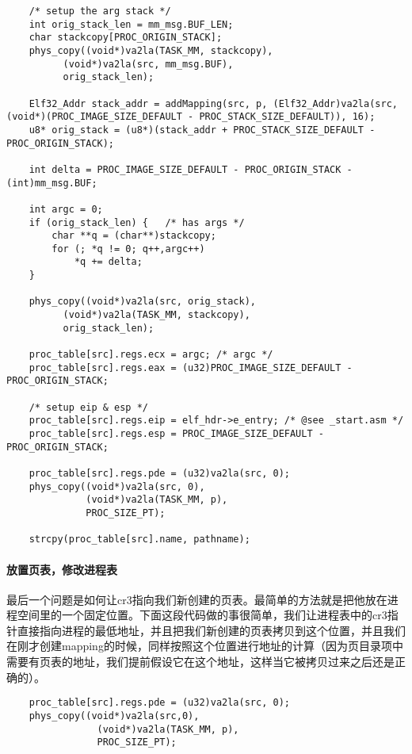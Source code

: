 \documentclass{whureport}
\begin{document}
\begin{lstlisting}
	/* setup the arg stack */
	int orig_stack_len = mm_msg.BUF_LEN;
	char stackcopy[PROC_ORIGIN_STACK];
	phys_copy((void*)va2la(TASK_MM, stackcopy),
		  (void*)va2la(src, mm_msg.BUF),
		  orig_stack_len);

    Elf32_Addr stack_addr = addMapping(src, p, (Elf32_Addr)va2la(src, (void*)(PROC_IMAGE_SIZE_DEFAULT - PROC_STACK_SIZE_DEFAULT)), 16);
    u8* orig_stack = (u8*)(stack_addr + PROC_STACK_SIZE_DEFAULT - PROC_ORIGIN_STACK);

    int delta = PROC_IMAGE_SIZE_DEFAULT - PROC_ORIGIN_STACK - (int)mm_msg.BUF;

    int argc = 0;
	if (orig_stack_len) {	/* has args */
		char **q = (char**)stackcopy;
		for (; *q != 0; q++,argc++)
			*q += delta;
	}

	phys_copy((void*)va2la(src, orig_stack),
		  (void*)va2la(TASK_MM, stackcopy),
		  orig_stack_len);

	proc_table[src].regs.ecx = argc; /* argc */
    proc_table[src].regs.eax = (u32)PROC_IMAGE_SIZE_DEFAULT - PROC_ORIGIN_STACK;

    /* setup eip & esp */
	proc_table[src].regs.eip = elf_hdr->e_entry; /* @see _start.asm */
    proc_table[src].regs.esp = PROC_IMAGE_SIZE_DEFAULT - PROC_ORIGIN_STACK;

    proc_table[src].regs.pde = (u32)va2la(src, 0);
    phys_copy((void*)va2la(src, 0),
              (void*)va2la(TASK_MM, p),
              PROC_SIZE_PT);

    strcpy(proc_table[src].name, pathname);
\end{lstlisting}


\paragraph{放置页表，修改进程表} 最后一个问题是如何让cr3指向我们新创建的页表。最简单的方法就是把他放在进程空间里的一个固定位置。下面这段代码做的事很简单，我们让进程表中的cr3指针直接指向进程的最低地址，并且把我们新创建的页表拷贝到这个位置，并且我们在刚才创建mapping的时候，同样按照这个位置进行地址的计算（因为页目录项中需要有页表的地址，我们提前假设它在这个地址，这样当它被拷贝过来之后还是正确的）。


\begin{lstlisting}
	proc_table[src].regs.pde = (u32)va2la(src, 0);
	phys_copy((void*)va2la(src,0),
				(void*)va2la(TASK_MM, p),
				PROC_SIZE_PT);
\end{lstlisting}
\end{document}

